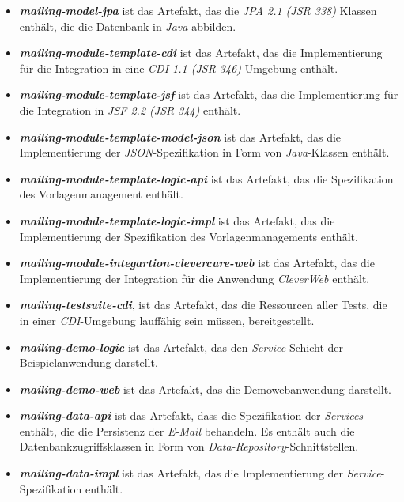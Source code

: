 \begin{itemize}
	\item\emph{\textbf{mailing-model-jpa}} 
	\newline
	ist das Artefakt, das die \emph{JPA 2.1 (JSR 338)} Klassen enthält, die die Datenbank in \emph{Java} abbilden.
	\item\emph{\textbf{mailing-module-template-cdi}} 
	\newline
	ist das Artefakt, das die Implementierung für die Integration in eine \emph{CDI 1.1 (JSR 346)} Umgebung  enthält.
	\item\emph{\textbf{mailing-module-template-jsf}}
	\newline
	ist das Artefakt, das die Implementierung für die Integration in \emph{JSF 2.2 (JSR 344)} enthält.
	\item\emph{\textbf{mailing-module-template-model-json}}
	\newline
	ist das Artefakt, das die Implementierung der \emph{JSON}-Spezifikation in Form von \emph{Java}-Klassen enthält.	
	\item\emph{\textbf{mailing-module-template-logic-api}} 
	\newline
	ist das Artefakt, das die Spezifikation des Vorlagenmanagement enthält.
	\item\emph{\textbf{mailing-module-template-logic-impl}} 
	\newline
	ist das Artefakt, das die Implementierung der Spezifikation des Vorlagenmanagements enthält.
	\item\emph{\textbf{mailing-module-integartion-clevercure-web}}
	\newline
	ist das Artefakt, das die Implementierung der Integration für die Anwendung \emph{CleverWeb} enthält.
	\item\emph{\textbf{mailing-testsuite-cdi}},
	\newline
	ist das Artefakt, das die Ressourcen aller Tests, die in einer \emph{CDI}-Umgebung lauffähig sein müssen, bereitgestellt.
	\item\emph{\textbf{mailing-demo-logic}}
	\newline
	ist das Artefakt, das den \emph{Service}-Schicht der Beispielanwendung darstellt.
	\item\emph{\textbf{mailing-demo-web}}
	\newline
	ist das Artefakt, das die Demowebanwendung darstellt.
	\item\emph{\textbf{mailing-data-api}}
	\newline
	ist das Artefakt, dass die Spezifikation der \emph{Services} enthält, die die Persistenz der \emph{E-Mail} behandeln. Es enthält auch die Datenbankzugriffsklassen in Form von \emph{Data-Repository}-Schnittstellen.
	\item\emph{\textbf{mailing-data-impl}}
	\newline
	ist das Artefakt, das die Implementierung der \emph{Service}-Spezifikation enthält.
\end{itemize} 


